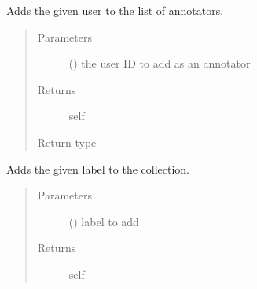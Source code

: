 \documentclass[letterpaper,10pt,english]{sphinxmanual}
\begin{document}
\begin{fulllineitems}
\begin{fulllineitems}
\label{\detokenize{autoapi/pine/client/models/index:pine.client.models.CollectionBuilder.annotator}}
Adds the given user to the list of annotators.
\begin{quote}\begin{description}
\item[{Parameters}] \leavevmode
{} () \textendash{} the user ID to add as an annotator

\item[{Returns}] \leavevmode
self

\item[{Return type}] \leavevmode
{\hyperref[\detokenize{autoapi/pine/client/models/index:pine.client.models.CollectionBuilder}]{}}

\end{description}\end{quote}

\end{fulllineitems}


\begin{fulllineitems}
\label{\detokenize{autoapi/pine/client/models/index:pine.client.models.CollectionBuilder.label}}
Adds the given label to the collection.
\begin{quote}\begin{description}
\item[{Parameters}] \leavevmode
{} () \textendash{} label to add

\item[{Returns}] \leavevmode
self


\end{description}
\end{quote}
\end{fulllineitems}
\end{fulllineitems}
\end{document}
